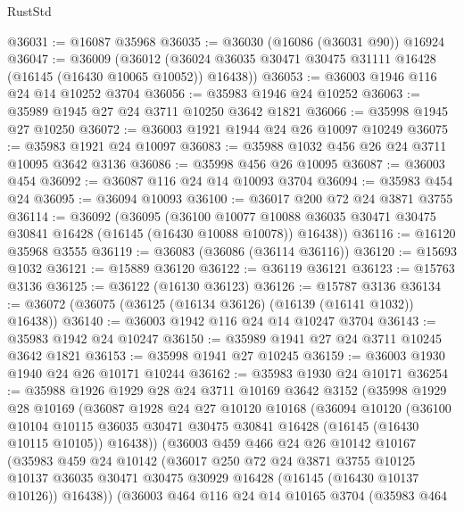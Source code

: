 \begin{lexlean}{RustStd}
\begin{coremodule}
@36031 := @16087 @35968
@36035 := @36030 (@16086 (@36031 @90)) @16924
@36047 := @36009
    (@36012 (@36024 @36035 @30471 @30475 @31111 @16428 (@16145 (@16430 @10065 @10052)) @16438))
@36053 := @36003 @1946 @116 @24 @14 @10252 @3704
@36056 := @35983 @1946 @24 @10252
@36063 := @35989 @1945 @27 @24 @3711 @10250 @3642 @1821
@36066 := @35998 @1945 @27 @10250
@36072 := @36003 @1921 @1944 @24 @26 @10097 @10249
@36075 := @35983 @1921 @24 @10097
@36083 := @35988 @1032 @456 @26 @24 @3711 @10095 @3642 @3136
@36086 := @35998 @456 @26 @10095
@36087 := @36003 @454
@36092 := @36087 @116 @24 @14 @10093 @3704
@36094 := @35983 @454 @24
@36095 := @36094 @10093
@36100 := @36017 @200 @72 @24 @3871 @3755
@36114 := @36092
    (@36095
      (@36100
        @10077
        @10088
        @36035
        @30471
        @30475
        @30841
        @16428
        (@16145 (@16430 @10088 @10078))
        @16438))
@36116 := @16120 @35968 @3555
@36119 := @36083 (@36086 (@36114 @36116))
@36120 := @15693 @1032
@36121 := @15889 @36120
@36122 := @36119 @36121
@36123 := @15763 @3136
@36125 := @36122 (@16130 @36123)
@36126 := @15787 @3136
@36134 := @36072 (@36075 (@36125 (@16134 @36126) (@16139 (@16141 @1032)) @16438))
@36140 := @36003 @1942 @116 @24 @14 @10247 @3704
@36143 := @35983 @1942 @24 @10247
@36150 := @35989 @1941 @27 @24 @3711 @10245 @3642 @1821
@36153 := @35998 @1941 @27 @10245
@36159 := @36003 @1930 @1940 @24 @26 @10171 @10244
@36162 := @35983 @1930 @24 @10171
@36254 := @35988
    @1926
    @1929
    @28
    @24
    @3711
    @10169
    @3642
    @3152
    (@35998
      @1929
      @28
      @10169
      (@36087
        @1928
        @24
        @27
        @10120
        @10168
        (@36094
          @10120
          (@36100
            @10104
            @10115
            @36035
            @30471
            @30475
            @30841
            @16428
            (@16145 (@16430 @10115 @10105))
            @16438))
        (@36003
          @459
          @466
          @24
          @26
          @10142
          @10167
          (@35983
            @459
            @24
            @10142
            (@36017
              @250
              @72
              @24
              @3871
              @3755
              @10125
              @10137
              @36035
              @30471
              @30475
              @30929
              @16428
              (@16145 (@16430 @10137 @10126))
              @16438))
          (@36003
            @464
            @116
            @24
            @14
            @10165
            @3704
            (@35983
              @464

\end{coremodule}
\end{lexlean}
